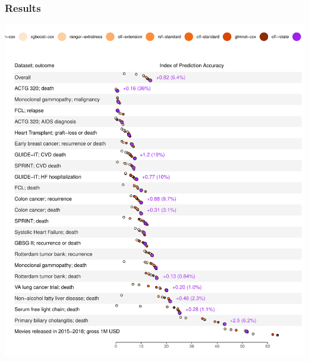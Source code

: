 \documentclass[twoside,11pt]{article}\usepackage[]{graphicx}\usepackage[]{xcolor}
\makeatletter
\def\maxwidth{ %
  \ifdim\Gin@nat@width>\linewidth
    \linewidth
  \else
    \Gin@nat@width
  \fi
}
\newenvironment{knitrout}{}{} %
\makeatother
\begin{document}
\subsubsection{Results}

\begin{knitrout}
\color{fgcolor}
\includegraphics[width=\maxwidth]{figure/unnamed-chunk-2-1} 
\end{knitrout}
\end{document}
